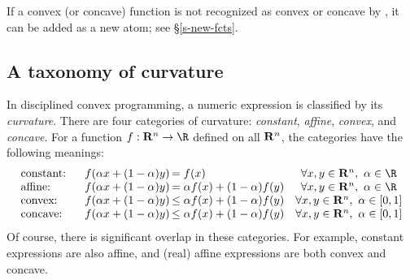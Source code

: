 \documentclass[12pt]{article}
\begin{document}
If a convex (or concave) function is not recognized as
convex or concave by \cvx, it can be added as a new atom;
see \S\ref{s-new-fcts}.



\subsection{A taxonomy of curvature}
\label{sec:taxonomy}

In disciplined convex programming, a numeric expression is classified
by its \emph{curvature}. There are four
categories of curvature:
\emph{constant}, \emph{affine}, \emph{convex}, and \emph{concave}.
For a function $f:\Rn\rightarrow\R$ defined on all $\mathbf{R}^{n}$,
the categories have the following meanings:
\begin{equation*}
\begin{array}{lc@{\,}lc}
\text{constant:}    & f(\alpha x + (1-\alpha)y) & = f(x) &
 \forall x,y\in\Rn,~\alpha\in\R\\
\text{affine:}      & f(\alpha x + (1-\alpha)y) & =
 \alpha f(x) + (1-\alpha) f(y) & \forall x,y\in\Rn,~\alpha\in\R \\
\text{convex:}  & f(\alpha x + (1-\alpha)y)
 & \leq \alpha f(x) + (1-\alpha) f(y) & \forall x,y\in\Rn,~\alpha\in [0,1] \\
\text{concave:}     \quad & f(\alpha x + (1-\alpha)y) & 
\leq \alpha f(x) + (1-\alpha) f(y) &
\forall x,y\in\Rn,~\alpha\in [0,1] 
\end{array}
\end{equation*}
Of course, there is significant
overlap in these categories. 
For example, constant expressions are also affine,
and (real) affine expressions are both convex and concave.
\end{document}
